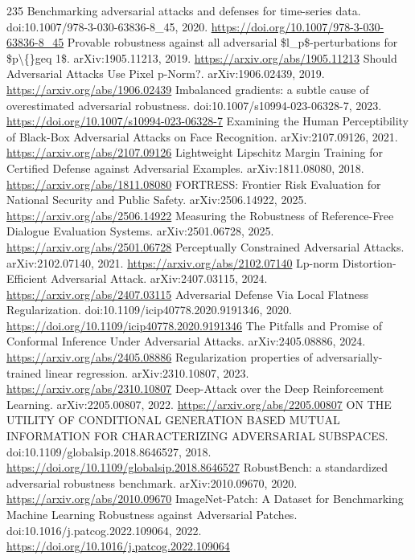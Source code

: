 \documentclass[11pt]{article}
\begin{document}
\begin{thebibliography}{235}
 Benchmarking adversarial attacks and defenses for time-series data. doi:10.1007/978-3-030-63836-8\_45, 2020. \url{https://doi.org/10.1007/978-3-030-63836-8_45}
 Provable robustness against all adversarial \$l\_p\$-perturbations for \$p\textbackslash\{\}geq 1\$. arXiv:1905.11213, 2019. \url{https://arxiv.org/abs/1905.11213}
 Should Adversarial Attacks Use Pixel p-Norm?. arXiv:1906.02439, 2019. \url{https://arxiv.org/abs/1906.02439}
 Imbalanced gradients: a subtle cause of overestimated adversarial robustness. doi:10.1007/s10994-023-06328-7, 2023. \url{https://doi.org/10.1007/s10994-023-06328-7}
 Examining the Human Perceptibility of Black-Box Adversarial Attacks on Face Recognition. arXiv:2107.09126, 2021. \url{https://arxiv.org/abs/2107.09126}
 Lightweight Lipschitz Margin Training for Certified Defense against Adversarial Examples. arXiv:1811.08080, 2018. \url{https://arxiv.org/abs/1811.08080}
 FORTRESS: Frontier Risk Evaluation for National Security and Public Safety. arXiv:2506.14922, 2025. \url{https://arxiv.org/abs/2506.14922}
 Measuring the Robustness of Reference-Free Dialogue Evaluation Systems. arXiv:2501.06728, 2025. \url{https://arxiv.org/abs/2501.06728}
 Perceptually Constrained Adversarial Attacks. arXiv:2102.07140, 2021. \url{https://arxiv.org/abs/2102.07140}
 Lp-norm Distortion-Efficient Adversarial Attack. arXiv:2407.03115, 2024. \url{https://arxiv.org/abs/2407.03115}
 Adversarial Defense Via Local Flatness Regularization. doi:10.1109/icip40778.2020.9191346, 2020. \url{https://doi.org/10.1109/icip40778.2020.9191346}
 The Pitfalls and Promise of Conformal Inference Under Adversarial Attacks. arXiv:2405.08886, 2024. \url{https://arxiv.org/abs/2405.08886}
 Regularization properties of adversarially-trained linear regression. arXiv:2310.10807, 2023. \url{https://arxiv.org/abs/2310.10807}
 Deep-Attack over the Deep Reinforcement Learning. arXiv:2205.00807, 2022. \url{https://arxiv.org/abs/2205.00807}
 ON THE UTILITY OF CONDITIONAL GENERATION BASED MUTUAL INFORMATION FOR CHARACTERIZING ADVERSARIAL SUBSPACES. doi:10.1109/globalsip.2018.8646527, 2018. \url{https://doi.org/10.1109/globalsip.2018.8646527}
 RobustBench: a standardized adversarial robustness benchmark. arXiv:2010.09670, 2020. \url{https://arxiv.org/abs/2010.09670}
 ImageNet-Patch: A Dataset for Benchmarking Machine Learning Robustness against Adversarial Patches. doi:10.1016/j.patcog.2022.109064, 2022. \url{https://doi.org/10.1016/j.patcog.2022.109064}

\end{thebibliography}
\end{document}

